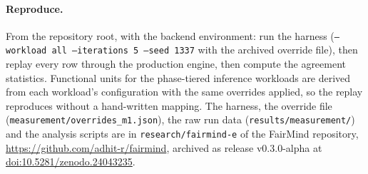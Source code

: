 \documentclass{article}
\begin{document}
\paragraph{Reproduce.} From the repository root, with the backend environment:
run the harness (\texttt{--workload all --iterations 5 --seed 1337} with the
archived override file), then replay every row through the production engine,
then compute the agreement statistics. Functional units for the phase-tiered
inference workloads are derived from each workload's configuration with the
same overrides applied, so the replay reproduces without a hand-written mapping.
The harness, the override file (\texttt{measurement/overrides\_m1.json}), the
raw run data (\texttt{results/measurement/}) and the analysis scripts are in
\texttt{research/fairmind-e} of the FairMind repository,
\url{https://github.com/adhit-r/fairmind}, archived as release v0.3.0-alpha at
\href{https://doi.org/10.5281/zenodo.24043235}{doi:10.5281/zenodo.24043235}.
\end{document}
